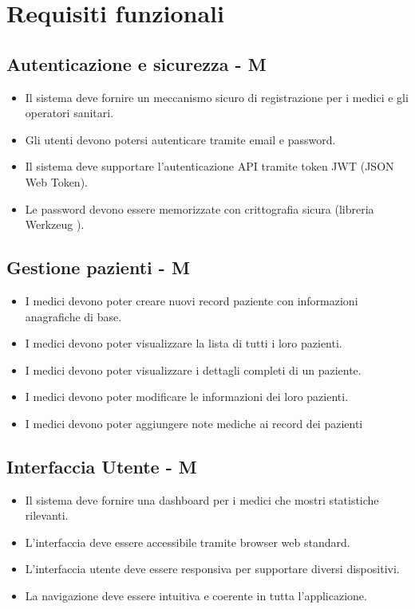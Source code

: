 \documentclass[12pt,a4paper,oneside]{report}
\begin{document}
\section{Requisiti funzionali}

\subsection{Autenticazione e sicurezza - M}

\begin{itemize}
    \item Il sistema deve fornire un meccanismo sicuro di registrazione per i medici e gli operatori sanitari.
    \item Gli utenti devono potersi autenticare tramite email e password.
  \item Il sistema deve supportare l'autenticazione API tramite token JWT (JSON Web Token).
    \item Le password devono essere memorizzate con crittografia sicura (libreria Werkzeug \cite{werkzeug}).
\end{itemize}

\subsection{Gestione pazienti - M}

\begin{itemize}
    \item I medici devono poter creare nuovi record paziente con informazioni anagrafiche di base.
    \item I medici devono poter visualizzare la lista di tutti i loro pazienti.
    \item I medici devono poter visualizzare i dettagli completi di un paziente.
    \item I medici devono poter modificare le informazioni dei loro pazienti.
    \item I medici devono poter aggiungere note mediche ai record dei pazienti
\end{itemize}

\subsection{Interfaccia Utente - M}

\begin{itemize}
    \item Il sistema deve fornire una dashboard per i medici che mostri statistiche rilevanti.
    \item L'interfaccia deve essere accessibile tramite browser web standard.
    \item L'interfaccia utente deve essere responsiva per supportare diversi dispositivi.
    \item La navigazione deve essere intuitiva e coerente in tutta l'applicazione.
\end{itemize}
\end{document}
